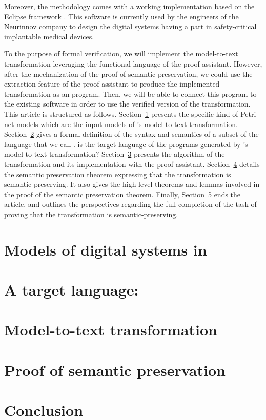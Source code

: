 \documentclass[pdflatex,sn-mathphys]{sn-jnl}%
\theoremstyle{thmstyleone}%
\theoremstyle{thmstyletwo}%
\theoremstyle{thmstylethree}%
\begin{document}
Moreover, the \hilecop{} methodology comes with a working
implementation based on the Eclipse framework . This software is
currently used by the engineers of the Neurinnov company to design the
digital systems having a part in safety-critical implantable medical
devices.

To the purpose of formal verification, we will implement the
\hilecop{} model-to-text transformation leveraging the functional
language of the \coq{} proof assistant. However, after the
mechanization of the proof of semantic preservation, we could use the
extraction feature of the \coq{} proof assistant to produce the
implemented transformation as an \ocaml{} program. Then, we will be
able to connect this program to the existing \hilecop{} software in
order
to use the verified version of the transformation.\\

This article is structured as
follows. Section~\ref{sec:hilecop-models} presents the specific kind
of Petri net models which are the input models of \hilecop{}'s
model-to-text transformation.  Section~\ref{sec:hvhdl} gives a formal
definition of the syntax and semantics of a subset of the \vhdl{}
language that we call \hvhdl{}. \hvhdl{} is the target language of the
programs generated by \hilecop{}'s model-to-text transformation?
Section~\ref{sec:m2t} presents the algorithm of the transformation and
its implementation with the \coq{} proof assistant.
Section~\ref{sec:proof} details the semantic preservation theorem
expressing that the \hilecop{} transformation is semantic-preserving.
It also gives the high-level theorems and lemmas involved in the proof
of the semantic preservation theorem.  Finally,
Section~\ref{sec:concl} ends the article, and outlines the
perspectives regarding the full completion of the task of proving that
the \hilecop{} transformation is semantic-preserving.

\section{Models of digital systems in \hilecop{}}
\label{sec:hilecop-models}

\section{A target language: \hvhdl{}}
\label{sec:hvhdl}

\section{Model-to-text transformation}
\label{sec:m2t}

\section{Proof of semantic preservation}
\label{sec:proof}

\section{Conclusion}
\label{sec:concl}



\end{document}
